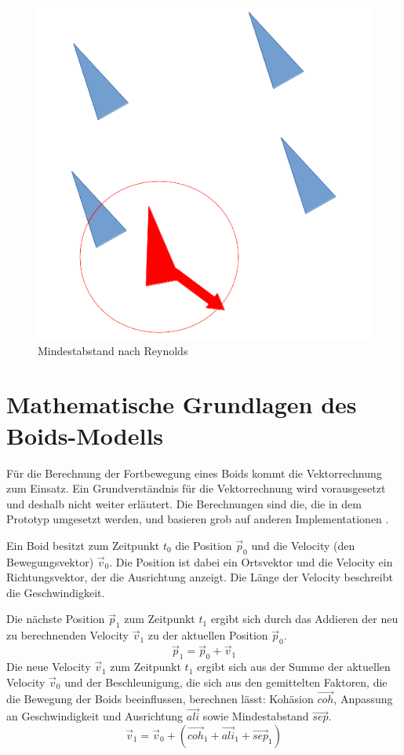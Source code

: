 \documentclass[draft=false
              ,paper=a4
              ,twoside=false
              ,fontsize=11pt
              ,headsepline
              ,BCOR10mm
              ,DIV11
              ,bibtotoc
              ,liststotoc
              ]{scrbook}
\begin{document}
\begin{figure}[!h]
\centering
\includegraphics[scale=0.4]{project/separation.png}
\caption{Mindestabstand nach Reynolds \cite{reynolds87}}
\label{separation}
\end{figure}

\section{Mathematische Grundlagen des Boids-Modells}\label{mathe}
Für die Berechnung der Fortbewegung eines Boids kommt die Vektorrechnung zum Einsatz. Ein Grundverständnis für die Vektorrechnung wird vorausgesetzt und deshalb nicht weiter erläutert. Die Berechnungen sind die, die in dem Prototyp umgesetzt werden, und basieren grob auf anderen Implementationen \cite{Bourg:2004:AGD:1096109}\cite{nature}.

Ein Boid besitzt zum Zeitpunkt \(t_0\) die Position \(\vec{p}_0\) und die Velocity (den Bewegungsvektor) \(\vec{v}_0\). Die Position ist dabei ein Ortsvektor und die Velocity ein Richtungsvektor, der die Ausrichtung anzeigt. Die Länge der Velocity beschreibt die Geschwindigkeit.

Die nächste Position \(\vec{p}_1\) zum Zeitpunkt \(t_1\) ergibt sich durch das Addieren der neu zu berechnenden Velocity \(\vec{v}_1\) zu der aktuellen Position \(\vec{p}_0\).
\[\vec{p}_1 = \vec{p}_0 + \vec{v}_1 \]
Die neue Velocity \(\vec{v}_1\) zum Zeitpunkt \(t_1\) ergibt sich aus der Summe der aktuellen Velocity \(\vec{v}_0\) und der Beschleunigung, die sich aus den gemittelten Faktoren, die die Bewegung der Boids beeinflussen, berechnen lässt: Kohäsion \(\vec{coh}\), Anpassung an Geschwindigkeit und Ausrichtung \(\vec{ali}\) sowie Mindestabstand \(\vec{sep}\).
\[\vec{v}_1 = \vec{v}_0 + (\vec{coh}_1 + \vec{ali}_1 + \vec{sep}_1)\]
\end{document}
